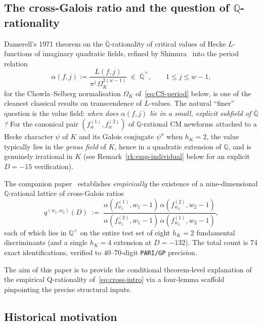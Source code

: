 \documentclass[11pt,a4paper]{amsart}
\theoremstyle{plain}
\theoremstyle{definition}
\newcommand{\Q}{\mathbb{Q}}
\newcommand{\Qbar}{\overline{\Q}}
\newcommand{\eqdef}{:=}
\newcommand{\fl}[2]{f_{#1}^{(#2)}}
\newcommand{\qstr}[2]{q^{(#1,#2)}}
\begin{document}
\subsection{The cross-Galois ratio and the question of $\Q$-rationality}

Damerell's 1971 theorem on the $\Qbar$-rationality of critical values of
Hecke $L$-functions of imaginary quadratic fields, refined by
Shimura~\cite{Shimura1976} into the period relation
\[
   \alpha(f, j) \eqdef \frac{L(f, j)}{\pi^j\,\Omega_K^{2(w-1)}}
   \;\in\; \Qbar^\times,
   \qquad 1 \le j \le w-1,
\]
for the Chowla--Selberg normalisation $\Omega_K$ of~\eqref{eq:CS-period}
below, is one of the cleanest classical results on transcendence of
$L$-values.  The natural ``finer'' question is the value field:
\emph{when does $\alpha(f, j)$ lie in a small, explicit subfield of
$\Qbar$?}  For the canonical pair $(\fl{w}{1}, \fl{w}{2})$ of
$\Q$-rational CM newforms attached to a Hecke character $\psi$ of
$K$ and its Galois conjugate $\psi^\sigma$ when $h_K = 2$, the value
typically lies in the \emph{genus field} of $K$, hence in a quadratic
extension of $\Q$, and is genuinely irrational in $K$ (see
Remark~\ref{rk:emp-individual} below for an explicit~$D = -15$
verification).

The companion paper~\cite{Remondiere2026P6} establishes
\emph{empirically} the existence of a nine-dimensional $\Q$-rational
lattice of cross-Galois ratios
\begin{equation}\label{eq:cross-intro}
   \qstr{w_1}{w_2}(D) \;\eqdef\;
   \frac{\alpha(\fl{w_1}{1}, w_1{-}1)\,\alpha(\fl{w_2}{2}, w_2{-}1)}
        {\alpha(\fl{w_1}{2}, w_1{-}1)\,\alpha(\fl{w_2}{1}, w_2{-}1)},
\end{equation}
each of which lies in $\Q^\times$ on the entire test set of eight $h_K = 2$
fundamental discriminants (and a single $h_K = 4$ extension at
$D = -132$).  The total count is $74$ exact identifications, verified to
$40$--$70$-digit \texttt{PARI/GP} precision.

The aim of this paper is to provide the conditional theorem-level
explanation of the empirical Q-rationality of~\eqref{eq:cross-intro} via
a four-lemma scaffold pinpointing the precise structural inputs.

\subsection{Historical motivation}
\end{document}

